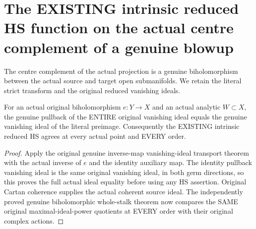 \section{The EXISTING intrinsic reduced HS function on the actual centre complement of a genuine blowup}

The centre complement of the actual projection is a genuine biholomorphism
between the actual source and target open submanifolds. We retain the
literal strict transform and the original reduced vanishing ideals.

\begin{lemma}
\label{hir:actual-biholomorphic-reduced-whole-ideal-and-hs}
\leanok
For an actual original biholomorphism $e:Y\to X$ and an actual analytic
$W\subset X$, the genuine pullback of the ENTIRE original vanishing ideal
equals the genuine vanishing ideal of the literal preimage. Consequently
the EXISTING intrinsic reduced HS agrees at every actual point and EVERY order.
\end{lemma}
\begin{proof}
Apply the original genuine inverse-map vanishing-ideal transport theorem
with the actual inverse of $e$ and the identity auxiliary map. The identity
pullback vanishing ideal is the same original vanishing ideal, in both
germ directions, so this proves the full actual ideal equality before
using any HS assertion. Original Cartan coherence supplies the actual
coherent source ideal. The independently proved genuine biholomorphic
whole-stalk theorem now compares the SAME original maximal-ideal-power
quotients at EVERY order with their original complex actions.
\end{proof}

